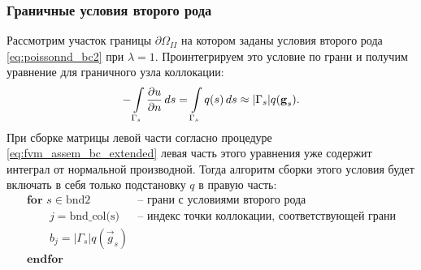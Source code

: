\subsubsection{Граничные условия второго рода}
Рассмотрим участок границы $\partial\Omega_{II}$ на котором заданы условия второго рода
\cref{eq:poissonnd_bc2} при $\lambda=1$.
Проинтегрируем это условие по грани и получим уравнение для граничного узла коллокации:
\begin{equation*}
-\arint{\dfr{u}{n}}{\Gamma_s}{s} = \arint{q(s)}{\Gamma_s}{s} \approx |\Gamma_s| q(\vec g_s).
\end{equation*}
При сборке матрицы левой части согласно процедуре
\cref{eq:fvm_assem_bc_extended} левая часть этого уравнения уже содержит
интеграл от нормальной производной.
Тогда алгоритм сборки этого условия будет включать в себя только подстановку $q$ в правую часть:
\begin{equation}
\label{eq:fvm_assem_bc2_extended}
\begin{array}{ll}
\textbf{for } s \in\textrm{bnd2}                         & \textrm{-- грани с условиями второго рода}\\ 
\qquad j = \textrm{bnd\_col(s)}                          & \textrm{-- индекс точки коллокации, соответствующей грани}\\
\qquad b_{j} = |\Gamma_s| q(\vec g_s)                    & \\
\textbf{endfor}                                          & \\
\end{array}
\end{equation}

